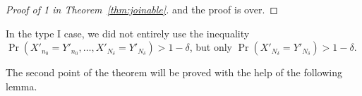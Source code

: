 \documentclass[12pt,a4paper]{article}
\begin{document}
\begin{proof}[Proof of 1 in Theorem~\ref{thm:joinable}]
%
%
%
%
%
%
%
%
%
%
%
and the proof is over.
\end{proof}

\begin{remark}
In the type I case, we did not entirely use the inequality 
$\Pr(X'_{n_0}=Y'_{n_0}, \ldots, X'_{N_\delta}=Y'_{N_\delta}) > 1-\delta$, but 
only $\Pr(X'_{N_\delta}=Y'_{N_\delta}) > 1-\delta$.
\end{remark}

The second point of the theorem will be proved with the help of the following lemma. 
\end{document}

